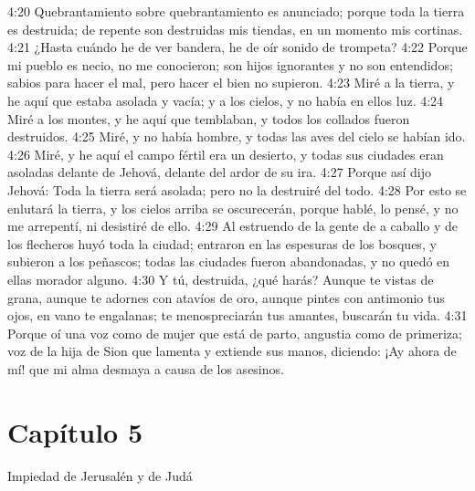 4:20 Quebrantamiento sobre quebrantamiento es anunciado; porque toda la tierra es destruida; de repente son destruidas mis tiendas, en un momento mis cortinas. 
4:21 ¿Hasta cuándo he de ver bandera, he de oír sonido de trompeta? 
4:22 Porque mi pueblo es necio, no me conocieron; son hijos ignorantes y no son entendidos; sabios para hacer el mal, pero hacer el bien no supieron. 
4:23 Miré a la tierra, y he aquí que estaba asolada y vacía; y a los cielos, y no había en ellos luz. 
4:24 Miré a los montes, y he aquí que temblaban, y todos los collados fueron destruidos. 
4:25 Miré, y no había hombre, y todas las aves del cielo se habían ido. 
4:26 Miré, y he aquí el campo fértil era un desierto, y todas sus ciudades eran asoladas delante de Jehová, delante del ardor de su ira. 
4:27 Porque así dijo Jehová: Toda la tierra será asolada; pero no la destruiré del todo. 
4:28 Por esto se enlutará la tierra, y los cielos arriba se oscurecerán, porque hablé, lo pensé, y no me arrepentí, ni desistiré de ello. 
4:29 Al estruendo de la gente de a caballo y de los flecheros huyó toda la ciudad; entraron en las espesuras de los bosques, y subieron a los peñascos; todas las ciudades fueron abandonadas, y no quedó en ellas morador alguno. 
4:30 Y tú, destruida, ¿qué harás? Aunque te vistas de grana, aunque te adornes con atavíos de oro, aunque pintes con antimonio tus ojos, en vano te engalanas; te menospreciarán tus amantes, buscarán tu vida. 
4:31 Porque oí una voz como de mujer que está de parto, angustia como de primeriza; voz de la hija de Sion que lamenta y extiende sus manos, diciendo: ¡Ay ahora de mí! que mi alma desmaya a causa de los asesinos. 
\section*{Capítulo 5 }
Impiedad de Jerusalén y de Judá 
 

